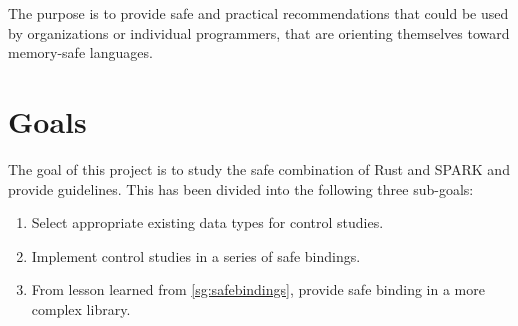 \documentclass[nomenclature, english, bibtex]{kththesis}
\newcommand*{\generalExpl}[1]{\todo[inline]{#1}}
\newcommand*{\sweExpl}[1]{\todo[inline, backgroundcolor=kth-lightblue40]{#1}}  %
\begin{document}
The purpose is to provide safe and practical recommendations that could be used by organizations or individual programmers, that are orienting themselves toward memory-safe languages.

\section{Goals}


The goal of this project is to study the safe combination of Rust and SPARK and provide guidelines. This has been divided into the following three sub-goals:

\begin{enumerate}[leftmargin=*, label=\textbf{Subgoal \arabic*}, ref={Subgoal \arabic*}]
\item\label{sg:selectdatatypes} Select appropriate existing data types for control studies.
\item\label{sg:safebindings} Implement control studies in a series of safe bindings.
\item\label{sg:providesafebindings} From lesson learned from \ref{sg:safebindings}, provide safe binding in a more complex library.
\end{enumerate}

\end{document}
